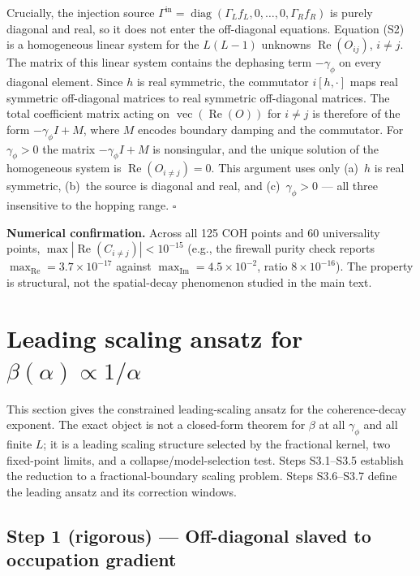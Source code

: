 \documentclass[aps,prb,twocolumn,superscriptaddress]{revtex4-2}
\begin{document}
Crucially, the injection source $\Gamma^{\text{in}} = \operatorname{diag}(\Gamma_L f_L, 0, \dots, 0, \Gamma_R f_R)$ is purely diagonal and real, so it does not enter the off-diagonal equations. Equation (S2) is a homogeneous linear system for the $L(L-1)$ unknowns $\operatorname{Re}(O_{ij})$, $i \neq j$. The matrix of this linear system contains the dephasing term $-\gamma_\phi$ on every diagonal element. Since $h$ is real symmetric, the commutator $i[h, \cdot]$ maps real symmetric off-diagonal matrices to real symmetric off-diagonal matrices. The total coefficient matrix acting on $\operatorname{vec}(\operatorname{Re}(O))$ for $i \neq j$ is therefore of the form $-\gamma_\phi I + M$, where $M$ encodes boundary damping and the commutator. For $\gamma_\phi > 0$ the matrix $-\gamma_\phi I + M$ is nonsingular, and the unique solution of the homogeneous system is $\operatorname{Re}(O_{i\neq j}) = 0$. This argument uses only (a)~$h$ is real symmetric, (b)~the source is diagonal and real, and (c)~$\gamma_\phi > 0$ --- all three insensitive to the hopping range. $\square$

\textbf{Numerical confirmation.} Across all 125 COH points and 60 universality points, $\max|\operatorname{Re}(C_{i\neq j})| < 10^{-15}$ (e.g., the firewall purity check reports $\max_{\operatorname{Re}} = 3.7\times10^{-17}$ against $\max_{\operatorname{Im}} = 4.5\times10^{-2}$, ratio $8\times10^{-16}$). The property is structural, not the spatial-decay phenomenon studied in the main text.

\section{Leading scaling ansatz for $\beta(\alpha) \propto 1/\alpha$}
\label{sec:S3}

This section gives the constrained leading-scaling ansatz for the coherence-decay exponent. The exact object is not a closed-form theorem for $\beta$ at all $\gamma_\phi$ and all finite $L$; it is a leading scaling structure selected by the fractional kernel, two fixed-point limits, and a collapse/model-selection test. Steps S3.1--S3.5 establish the reduction to a fractional-boundary scaling problem. Steps S3.6--S3.7 define the leading ansatz and its correction windows.

\subsection*{Step 1 (rigorous) --- Off-diagonal slaved to occupation gradient}
\end{document}
